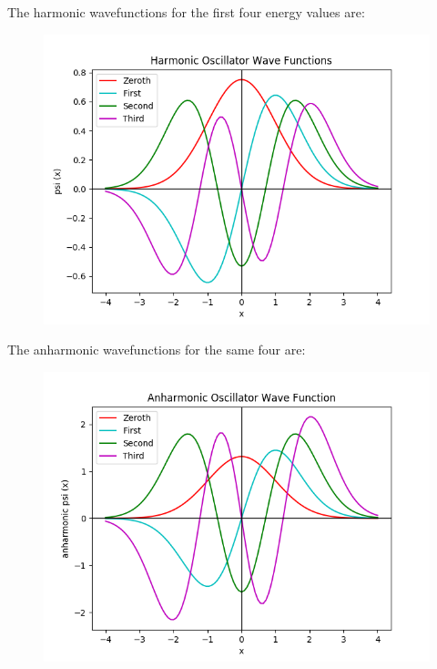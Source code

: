 \documentclass[12pt]{article}
\begin{document}
The harmonic wavefunctions for the first four energy values are:

\begin{figure}[H]
\begin{center}
\includegraphics[scale=0.8]{harm_osc.png}
\end{center}
\end{figure}

The anharmonic wavefunctions for the same four are:

\begin{figure}[H]
\begin{center}
\includegraphics[scale=0.8]{anharm_osc.png}
\end{center}
\end{figure}
\end{document}
